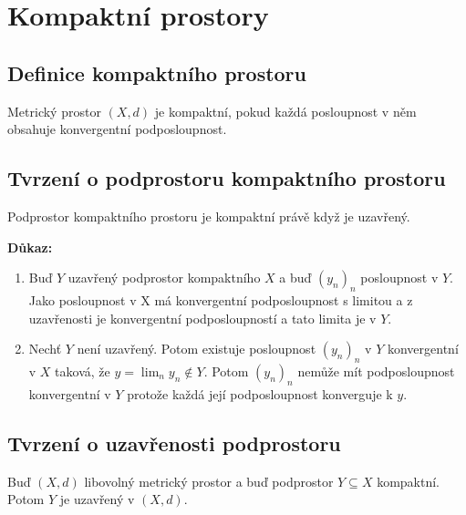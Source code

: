 \documentclass[../main.tex]{subfiles}
\begin{document}
\section{Kompaktní prostory}
\subsection{Definice kompaktního prostoru}
\hspace{1.2mm}
\noindent
Metrický prostor $(X,d)$ je kompaktní, pokud každá posloupnost v něm obsahuje konvergentní podposloupnost.

\subsection{Tvrzení o podprostoru kompaktního prostoru}
\hspace{1.2mm}
\noindent
Podprostor kompaktního prostoru je kompaktní právě když je uzavřený.

\vspace{5mm}
\noindent
\textbf{Důkaz:} 
\begin{enumerate}
    \item Buď $Y$ uzavřený podprostor kompaktního $X$ a buď $(y_n)_n$ posloupnost v $Y$. Jako posloupnost v X má 
    konvergentní podposloupnost s limitou a z uzavřenosti je konvergentní podposloupností a tato limita je v $Y$.
    \item Nechť $Y$ není uzavřený. Potom existuje posloupnost $(y_n)_n$ v $Y$ konvergentní v $X$ taková, že $y = \lim_n y_n \notin Y$. Potom $(y_n)_n$
    nemůže mít podposloupnost konvergentní v $Y$ protože každá její podposloupnost konverguje k $y$.
\end{enumerate}

\subsection{Tvrzení o uzavřenosti podprostoru} \label{ch:komp=>uz}
\hspace{1.2mm}
\noindent
Buď $(X,d)$ libovolný metrický prostor a
buď podprostor $Y \subseteq X$ kompaktní. Potom $Y$ je uzavřený v $(X,d)$.
\end{document}
